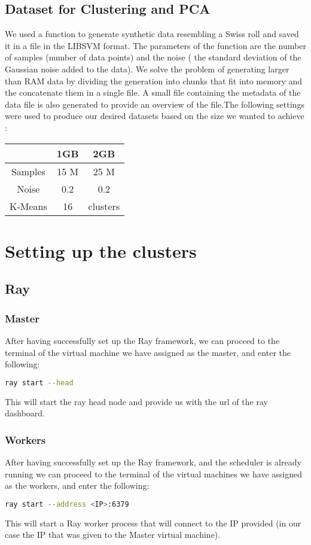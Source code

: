 \documentclass[conference]{IEEEtran}
\begin{document}
\subsection{Dataset for Clustering and PCA}
We used a function to generate synthetic data resembling a Swiss roll and saved it in a file in the LIBSVM format. The parameters of the function are the number of samples (number of data points) and the noise ( the standard deviation of the Gaussian noise added to the data). We solve the problem of generating larger than RAM data by dividing the generation into chunks that fit into memory and the concatenate them in a single file. A small file containing the metadata of the data file is also generated to provide an overview of the file.The following settings were used to produce our desired datasets based on the size we wanted to achieve :
 \begin{table}[ht]
    \centering
    \begin{tabular}{|c|c|c|}
    \hline
    ~ & 1GB & 2GB\\
    \hline
    Samples & 15 M & 25 M\\
    \hline
    Noise & 0.2 & 0.2\\
    \hline
    K-Means & 16 & clusters \\
    \hline
    \end{tabular}
\end{table}

\section{Setting up the clusters}

\subsection{Ray}
\subsubsection{Master}
After having successfully set up the Ray framework, we can proceed to the terminal of the virtual machine we have assigned as the master, and enter the following:
\begin{lstlisting}[language=bash]
ray start --head
\end{lstlisting}
This will start the ray head node and provide us with the url of the ray dashboard.
\subsubsection{Workers}
After having successfully set up the Ray framework, and the scheduler is already running we can proceed to the terminal of the virtual machines we have assigned as the workers, and enter the following:
\begin{lstlisting}[language=bash]
ray start --address <IP>:6379
\end{lstlisting}
This will start a Ray worker process that will connect to the IP provided (in our case the IP that was given to the Master virtual machine).
\end{document}
